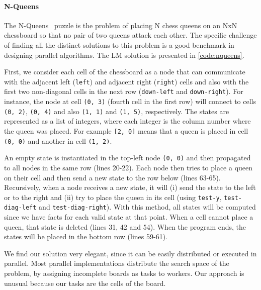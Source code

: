 \paragraph{N-Queens}

The N-Queens~\cite{8queens} puzzle is the problem of placing N chess queens on an NxN chessboard so
that no pair of two queens attack each other. The specific challenge of finding all the distinct
solutions to this problem is a good benchmark in designing parallel algorithms. The LM solution is presented
in \ref{code:nqueens}.

First, we consider each cell of the chessboard as a node that can communicate with the adjacent left
(\texttt{left}) and adjacent right (\texttt{right}) cells and also with the first two non-diagonal cells in the next row
(\texttt{down-left} and \texttt{down-right}). For instance, the node at cell \texttt{(0,~3)} (fourth cell in the first row) will connect
to cells \texttt{(0,~2)}, \texttt{(0,~4)} and also \texttt{(1,~1)} and \texttt{(1,~5)}, respectively. The states are represented as a list
of integers, where each integer is the column number where the queen was placed. For example \texttt{[2, 0]}
means that a queen is placed in cell \texttt{(0,~0)} and another in cell \texttt{(1,~2)}.

An empty state is instantiated in the top-left node \texttt{(0,~0)} and then propagated to all nodes in the same row (lines 20-22).
Each node then tries to place a queen on their cell and then send a new state to the row below (lines 63-65).
Recursively, when a node receives a new state, it will (i) send the state to the left
or to the right and (ii) try to place the queen in its cell (using \texttt{test-y}, \texttt{test-diag-left} and \texttt{test-diag-right}). With this method,
all states will be computed since we have facts for each valid state
at that point. When a cell cannot place a queen, that state is deleted (lines 31, 42 and 54).
When the program ends, the states will be placed in the bottom row (lines 59-61).

We find our solution very elegant, since it can be easily distributed or executed in parallel.
Most parallel implementations distribute the search space of the problem, by assigning incomplete boards as tasks to workers.
Our approach is unusual because our tasks are the cells of the board.

